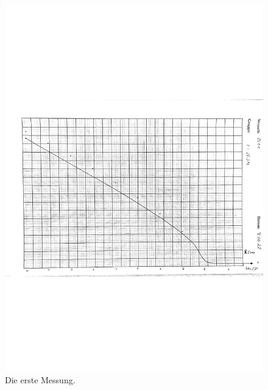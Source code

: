 \begin{figure}
    \centering
    \includegraphics[width=\linewidth]{pictures/kurve1.pdf}
    \caption{Die erste Messung.}
    \label{fig:kurve1}
\end{figure}

